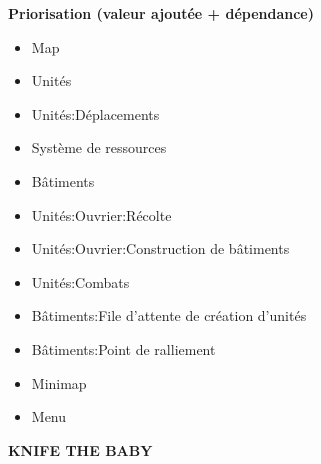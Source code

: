 \documentclass[12pt]{beamer}
\begin{document}
\begin{frame}
    \vspace{1cm}
    {\large \textbf{Priorisation (valeur ajoutée + dépendance)}} \\
    \begin{itemize}
        \item Map \\
        \item Unités \\
        \item Unités:Déplacements \\
        \item Système de ressources \\
        \item Bâtiments \\
        \item Unités:Ouvrier:Récolte \\
        \item Unités:Ouvrier:Construction de bâtiments \\
        \item Unités:Combats \\
        \item Bâtiments:File d'attente de création d'unités \\
        \item Bâtiments:Point de ralliement \\
        \item Minimap \\
        \item Menu \\
    \end{itemize}
\end{frame}

{ %
    \begin{frame}
        \begin{center}
            {\Huge \textbf{KNIFE THE BABY}}
        \end{center}
    \end{frame}
}
\end{document}
